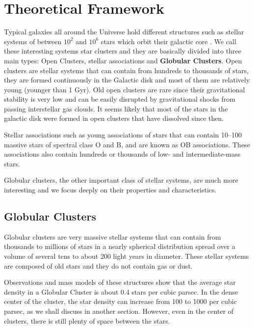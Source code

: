 \chapter{Theoretical Framework}

Typical galaxies all around the Universe hold different structures such as stellar systems of between $ 10^{2} $ and $ 10^{6} $ stars which orbit their galactic core . We call these interesting systems star clusters and they are basically divided into three main types: Open Clusters, stellar associations and \textbf{Globular Clusters}. Open clusters are stellar systems that can contain from hundreds to thousands of stars, they are formed continuously in the Galactic disk and most of them are relatively young (younger than 1 Gyr). Old open clusters are rare since their gravitational stability is very low and can be easily disrupted by gravitational shocks from passing interstellar gas clouds. It seems likely that most of the stars in the galactic disk were formed in open clusters that have dissolved since then. 

Stellar associations such as young associations of stars that can contain 10–100 massive stars of spectral class O and B, and are known as OB associations. These associations also contain hundreds or thousands of low- and intermediate-mass stars.

Globular clusters, the other important class of stellar systems, are much more interesting and we focus deeply on their properties and characteristics.  

\section{Globular Clusters}
 
Globular clusters are very massive stellar systems that can contain from thousands to millions of stars in a nearly spherical distribution spread over a volume of several tens to about 200 light years in diameter. These stellar systems are composed of old stars and they do not contain gas or dust. 

Observations and mass models of these structures show that the average star density in a Globular Cluster is about 0.4 stars per cubic parsec. In the dense center of the cluster, the star density can increase from 100 to 1000 per cubic parsec, as we shall discuss in another section. However, even in the center of clusters, there is still plenty of space between the stars.

